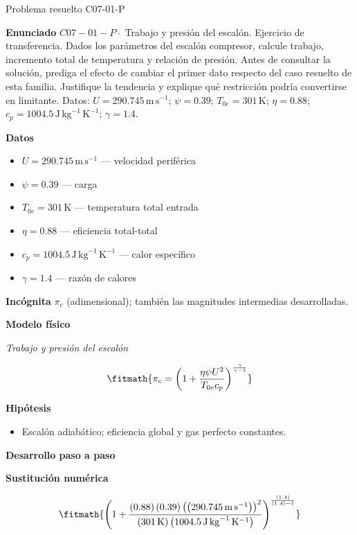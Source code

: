 \documentclass[10pt,openany]{book}
\begin{document}
\begin{studiumworked}{Problema resuelto C07-01-P}


\noindent\textbf{Enunciado}
\(C07-01-P \cdot\) Trabajo y presión del escalón. Ejercicio de transferencia. Dados los parámetros del escalón compresor, calcule trabajo, incremento total de temperatura y relación de presión. Antes de consultar la solución, prediga el efecto de cambiar el primer dato respecto del caso resuelto de esta familia. Justifique la tendencia y explique qué restricción podría convertirse en limitante. Datos: \(U=290.745\, \mathrm{m}\,\mathrm{s}^{-1}\); \(\psi=0.39\); \(T_{0e}=301\, \mathrm{K}\); \(\eta=0.88\); \(c_p=1004.5\, \mathrm{J}\,\mathrm{kg}^{-1}\,\mathrm{K}^{-1}\); \(\gamma=1.4\).

\noindent\textbf{Datos}
\begin{itemize}
\item $U = 290.745\,\mathrm{m}\,\mathrm{s}^{-1}$ — velocidad periférica
\item $\psi = 0.39$ — carga
\item $T_{0e} = 301\,\mathrm{K}$ — temperatura total entrada
\item $\eta = 0.88$ — eficiencia total-total
\item $c_p = 1004.5\,\mathrm{J}\,\mathrm{kg}^{-1}\,\mathrm{K}^{-1}$ — calor específico
\item $\gamma = 1.4$ — razón de calores
\end{itemize}

\noindent\textbf{Incógnita}
$\pi_c$ (adimensional); también las magnitudes intermedias desarrolladas.

\noindent\textbf{Modelo físico}

\noindent\textit{Trabajo y presión del escalón}

\[
\fitmath{\pi_c=\left(1 + \frac{\eta \psi U^{2}}{T_{0e} c_p}\right)^{\frac{\gamma}{\gamma - 1}}}
\]

\noindent\textbf{Hipótesis}
\begin{itemize}
\item Escalón adiabático; eficiencia global y gas perfecto constantes.
\end{itemize}

\noindent\textbf{Desarrollo paso a paso}



\noindent\textbf{Sustitución numérica}

\[
\fitmath{\left(1 + \frac{\left(0.88\right) \left(0.39\right) \left(\left(290.745\,\mathrm{m}\,\mathrm{s}^{-1}\right)\right)^{2}}{\left(301\,\mathrm{K}\right) \left(1004.5\,\mathrm{J}\,\mathrm{kg}^{-1}\,\mathrm{K}^{-1}\right)}\right)^{\frac{\left(1.4\right)}{\left(1.4\right) - 1}}}
\]


\end{studiumworked}
\end{document}

